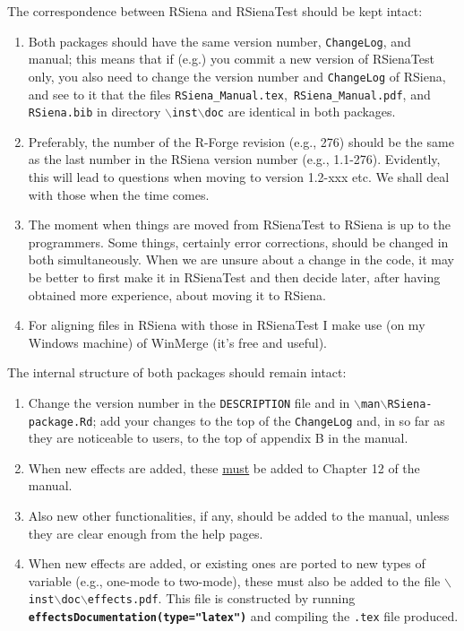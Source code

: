 \documentclass[12pt, a4paper]{article}
\renewcommand{\=}{\,=\,}
\newcommand{\+}{\,+\,}
\newcommand{\sfn}[1]{\textbf{\texttt{#1}}}
\newcommand{\bs}{\backslash}
\newcommand{\rs}{{\sf RSiena}}
\newcommand{\RS}{{\sf RSiena }}
\newcommand{\RST}{{\sf RSienaTest }}
\begin{document}
The correspondence between \RS and \RST should be kept intact:
\begin{enumerate}
\item Both packages should have the same version number, \texttt{ChangeLog}, and
     manual; this means that if (e.g.) you commit a new version of \RST only,
     you also need to change the version number and \texttt{ChangeLog} of \rs,
     and see to it that the files \texttt{RSiena\_Manual.tex},\ \texttt{RSiena\_Manual.pdf},
     and \texttt{RSiena.bib} in directory \texttt{$\bs$inst$\bs$doc} are identical
     in both packages.
\item Preferably, the number of the R-Forge revision (e.g., 276) should
     be the same as the last number in the \RS version number (e.g., 1.1-276).
     Evidently, this will lead to questions when moving to version 1.2-xxx etc.
     We shall deal with those when the time comes.
\item The moment when things are moved from \RST to \RS is up to the programmers.
     Some things, certainly error corrections, should be changed in both simultaneously.
     When we are unsure about a change in the code, it may be better to first
     make it in \RST and then decide later, after having obtained more experience,
     about moving it to \rs.
\item For aligning files in \RS with those in \RST I make use (on my Windows machine)
     of WinMerge (it's free and useful).
\end{enumerate}

The internal structure of both packages should remain intact:
\begin{enumerate}
\item Change the version number in the \texttt{DESCRIPTION} file and in
      \texttt{$\bs$man$\bs$RSiena-package.Rd};
      add your changes to the top of the \texttt{ChangeLog} and,
      in so far as they are noticeable
      to users, to the top of appendix B in the manual.
\item When new effects are added, these \underline{must} be added to
      Chapter 12 of the manual.
\item Also new other functionalities, if any, should be added to the manual,
      unless they are clear enough from the help pages.
\item When new effects are added, or existing ones are ported
      to new types of variable (e.g., one-mode to two-mode),
      these must also be added to the file
      \texttt{$\bs$inst$\bs$doc$\bs$effects.pdf}. This file is constructed by running
      \sfn{effectsDocumentation(type="latex")} and compiling the \texttt{.tex} file produced.
\end{enumerate}
\end{document}
